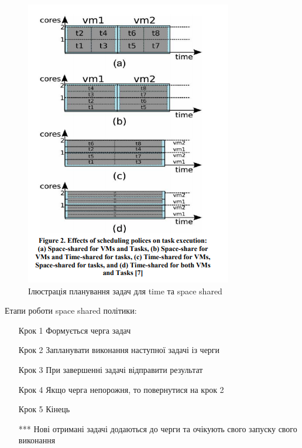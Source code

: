\begin{figure}[H]
	\centering
	\includegraphics[width=\textwidth]{task_analysis/img/time_space_shared}
	\caption{Ілюстрація планування задач для time та space shared }
	\label{fig:time_space_shared}
\end{figure}


Етапи роботи space shared політики:
\begin{itemize}
	\item[Крок 1] Формується черга задач
	\item[Крок 2] Запланувати виконання наступної задачі із черги
	\item[Крок 3] При завершенні задачі відправити результат
	\item[Крок 4] Якщо черга непорожня, то повернутися на крок 2
	\item[Крок 5] Кінець
	\item[***] Нові отримані задачі додаються до черги та очікують свого запуску свого виконання
\end{itemize}

